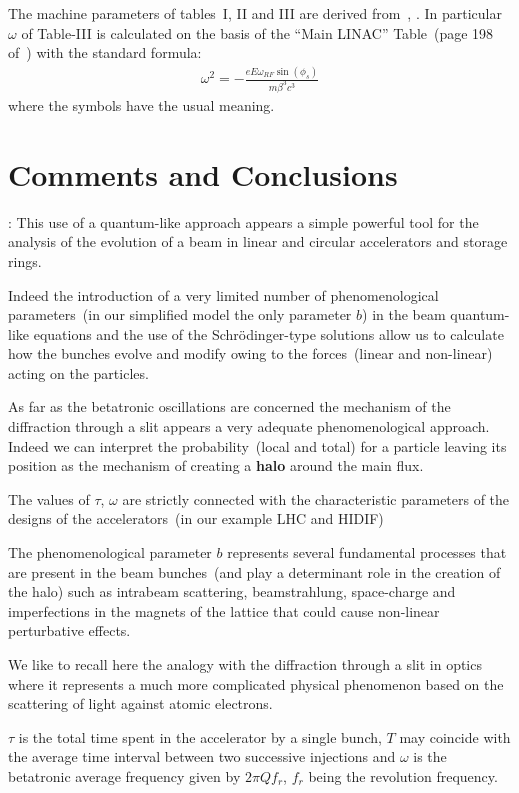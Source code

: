 \documentclass[]{article}
\begin{document}
\noindent
The machine parameters of tables~I, II and III are derived 
from~\cite{LHC}, \cite{HIDIF}. In particular $\omega$ of Table-III is 
calculated 
on the basis of the ``Main LINAC'' Table~(page 198 of~\cite{HIDIF})
with the standard formula:
\begin{eqnarray}
\omega^2 = - \frac{e E \omega_{RF} \sin{(\phi_s)}}{m \beta^3 c^3}
\end{eqnarray}
%
where the symbols have the usual meaning.

\section{Comments and Conclusions}

:
This use of a quantum-like approach appears a simple powerful tool for 
the analysis of the evolution of a beam in linear and circular
accelerators and storage rings.

Indeed the introduction of a very limited number of phenomenological
parameters~(in our simplified model the only parameter $b$) in the
beam quantum-like equations and the use of the Schr\"{o}dinger-type
solutions allow us to calculate how the bunches evolve and modify
owing to the forces~(linear and non-linear) acting on the particles.

As far as the betatronic oscillations are concerned the mechanism of the 
diffraction through a slit appears a very adequate phenomenological 
approach. Indeed we can interpret the probability~(local and total) for 
a particle leaving its position as the mechanism of creating a {\bf halo} 
around the main flux.

The values of $\tau$, $\omega$ are strictly connected with the 
characteristic parameters of the designs of the accelerators~(in
our example LHC and HIDIF)

The phenomenological parameter $b$ represents several fundamental
processes that are present in the beam bunches~(and play a determinant
role in the creation of the halo) such as intrabeam scattering,
beamstrahlung, space-charge and imperfections in the  magnets of 
the lattice that could cause non-linear perturbative effects.

We like to recall here the analogy with the diffraction through 
a slit in optics where it represents a much more complicated physical 
phenomenon based on the scattering of light against atomic electrons.

$\tau$ is the total time spent in the accelerator by a single bunch,
$T$ may coincide with the average time interval between two successive
injections and $\omega$ is the betatronic average frequency given by
$2 \pi Q f_{r}$, $f_{r}$ being the revolution frequency.
\end{document}
